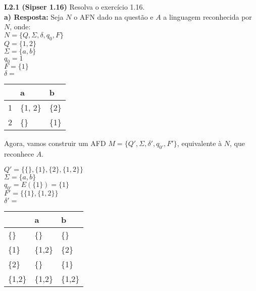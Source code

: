 
\noindent \textbf{L2.1 (Sipser 1.16)} Resolva o exercício 1.16.\\[3pt]
\noindent\textbf{a) Resposta:} Seja $N$ o AFN dado na questão e $A$ a linguagem reconhecida por $N$, onde:\\[6pt]
\noindent$N = \{Q, \Sigma, \delta, q_{0}, F\}$\\
$Q = \{1,2\}$\\
$\Sigma = \{a, b\}$\\
$q_0 = 1$\\
$F = \{1\}$\\
$\delta = $
\begin{table}[!h]
\centering
{}
\begin{tabular}{l|l|l}
        & a          & b        \\ \hline
1       & \{1, 2\}   & \{2\}    \\
2       & \{\}       & \{1\}    \\
\end{tabular}
\end{table}

Agora, vamos construir um AFD $M = \{Q', \Sigma, \delta', q_{0'}, F'\}$, equivalente à $N$, que reconhece $A$.

\noindent$Q' = \{\{\}, \{1\}, \{2\}, \{1,2\} \}$\\
$\Sigma = \{a, b\}$\\
$q_{0'} = E(\{1\}) = \{1\}$\\
$F' = \{\{1\}, \{1,2\}\}$\\
$\delta' = $
\begin{table}[!h]
\centering
{}
\begin{tabular}{l|l|l}
         & a         & b        \\ \hline
\{\}     & \{\}      & \{\}     \\
\{1\}    & \{1,2\}   & \{2\}    \\
\{2\}    & \{\}      & \{1\}    \\
\{1,2\}  & \{1,2\}   & \{1,2\}
\end{tabular}
\end{table}

